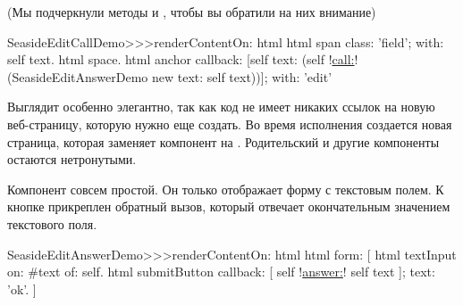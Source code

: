 \documentclass[a4paper,10pt,twoside]{book}
\begin{document}

(Мы подчеркнули методы  и , чтобы вы обратили
на них внимание)

\begin{code}{}
SeasideEditCallDemo>>>renderContentOn: html 
	html span
		class: 'field';
		with: self text.
	html space.
	html anchor
callback: [self text: (self !\underline{call:}! (SeasideEditAnswerDemo new text: self
text))];
		with: 'edit'
\end{code}{}


Выглядит особенно элегантно, так как код не имеет никаких ссылок на
новую веб-страницу, которую нужно еще создать.
Во время исполнения создается новая страница, которая заменяет
компонент  на .
Родительский и другие компоненты остаются нетронутыми.




Компонент  совсем простой.
Он только отображает форму с текстовым полем.
К кнопке прикреплен обратный вызов, который отвечает окончательным
значением текстового поля.

\begin{code}{}
SeasideEditAnswerDemo>>>renderContentOn: html
	html form: [
		html textInput
			on: #text of: self.
		html submitButton
			callback: [ self !\underline{answer:}! self text ];
			text: 'ok'.
		]
\end{code}{}
\end{document}

